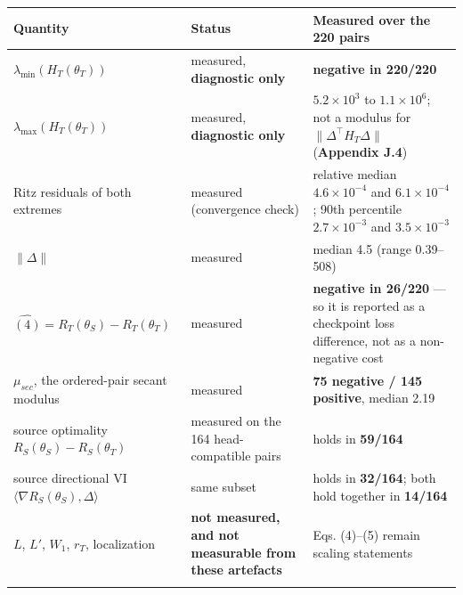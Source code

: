 \documentclass[pdflatex,sn-mathphys-ay]{sn-jnl}
\begin{document}
{\footnotesize
\setlength{\tabcolsep}{4pt}
\begin{longtable}{p{}p{}p{}}
\toprule
Quantity & Status & Measured over the 220 pairs \\
\midrule
\endhead
$\lambda_{\min}(H_T(\theta_T))$ & measured, \textbf{diagnostic only} & \textbf{negative in 220/220} \\
$\lambda_{\max}(H_T(\theta_T))$ & measured, \textbf{diagnostic only} & $5.2\times10^3$ to $1.1\times10^6$; not a modulus for $\|\Delta^{\top}H_T\Delta\|$ (\textbf{Appendix J.4}) \\
Ritz residuals of both extremes & measured (convergence check) & relative median $4.6\times10^{-4}$ and $6.1\times10^{-4}$; 90th percentile $2.7\times10^{-3}$ and $3.5\times10^{-3}$ \\
$\|\Delta\|$ & measured & median 4.5 (range 0.39--508) \\
$\widehat{(4)}=R_T(\theta_S)-R_T(\theta_T)$ & measured & \textbf{negative in 26/220} --- so it is reported as a checkpoint loss difference, not as a non-negative cost \\
$\mu_{sec}$, the ordered-pair secant modulus & measured & \textbf{75 negative / 145 positive}, median 2.19 \\
source optimality $R_S(\theta_S)-R_S(\theta_T)$ & measured on the 164 head-compatible pairs & holds in \textbf{59/164} \\
source directional VI $\langle\nabla R_S(\theta_S),\Delta\rangle$ & same subset & holds in \textbf{32/164}; both hold together in \textbf{14/164} \\
$L$, $L'$, $W_1$, $r_T$, localization & \textbf{not measured, and not measurable from these artefacts} & Eqs. (4)--(5) remain scaling statements \\
\botrule
\end{longtable}}
\end{document}
